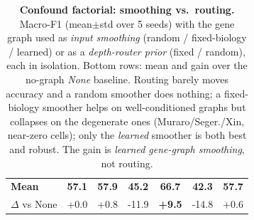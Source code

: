 \documentclass[letterpaper]{article}
\begin{document}
\begin{table}[t]
{\begin{tabular}{lcccccc}
\midrule
\textbf{Mean} & \textbf{57.1} & \textbf{57.9} & \textbf{45.2} & \textbf{66.7} & \textbf{42.3} & \textbf{57.7} \\
$\Delta$ vs None & +0.0 & +0.8 & -11.9 & \textbf{+9.5} & -14.8 & +0.6 \\
\bottomrule
\end{tabular}}
\caption{\textbf{Confound factorial: smoothing vs.\ routing.} Macro-F1 (mean$\pm$std over
5 seeds) with the gene graph used as \emph{input smoothing} (random / fixed-biology /
learned) or as a \emph{depth-router prior} (fixed / random), each in isolation. Bottom
rows: mean and gain over the no-graph \emph{None} baseline. Routing barely moves accuracy
and a random smoother does nothing; a fixed-biology smoother helps on well-conditioned
graphs but collapses on the degenerate ones (Muraro/Seger./Xin, near-zero cells); only the
\emph{learned} smoother is both best and robust. The gain is \emph{learned gene-graph
smoothing}, not routing.}
\label{tab:confound}
\end{table}
\fi %
\end{document}
